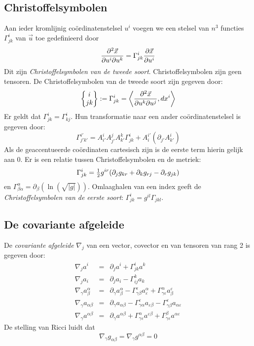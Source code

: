 \subsection{Christoffelsymbolen}
Aan ieder kromlijnig co\"ordinatenstelsel $u^i$ voegen we een stelsel van $n^3$
functies $\Gamma^i_{jk}$ van $\vec{u}$ toe gedefinieerd door
\[
\frac{\partial^2\vec{x}}{\partial u^i\partial u^k}=\Gamma_{jk}^i\frac{\partial \vec{x}}{\partial u^i}
\]
Dit zijn {\it Christoffelsymbolen van de tweede soort}. Christoffelsymbolen
zijn geen tensoren. De Christoffelsymbolen van de tweede soort zijn gegeven
door:
\[
\left\{\begin{array}{@{}c@{}}i\\ jk \end{array}\right\}:=\Gamma^i_{jk}=
\left\langle\frac{\partial^2\vec{x}}{\partial u^k\partial u^j},dx^i\right\rangle
\]
Er geldt dat $\Gamma^i_{jk}=\Gamma^i_{kj}$. Hun transformatie naar een ander
co\"ordinatenstelsel is gegeven door:
\[
\Gamma_{j'k'}^{i'}=A_{i'}^iA_{j'}^jA_{k'}^k\Gamma^i_{jk}+A_i^{i'}(\partial_{j'}A_{k'}^i)
\]
Als de geaccentueerde co\"ordinaten cartesisch zijn is de eerste term hierin
gelijk aan 0.
\npar
Er is een relatie tussen Christoffelsymbolen en de metriek:
\[
\Gamma_{jk}^i=\mbox{$\frac{1}{2}$} g^{ir}(\partial_j g_{kr}+\partial_k g_{rj}-\partial_r g_{jk})
\]
en $\Gamma^\alpha_{\beta\alpha}=\partial_\beta(\ln(\sqrt{|g|}))$.
\npar
Omlaaghalen van een index geeft de {\it Christoffelsymbolen van de eerste soort}:
$\Gamma^i_{jk}=g^{il}\Gamma_{jkl}$.

\subsection{De covariante afgeleide}
De {\it covariante afgeleide} $\nabla_j$ van een vector, covector en van
tensoren van rang 2 is gegeven door:
\begin{eqnarray*}
\nabla_ja^i                  &=&\partial_ja^i+\Gamma^i_{jk}a^k\\
\nabla_ja_i                  &=&\partial_ja_i-\Gamma^k_{ij}a_k\\
\nabla_\gamma a^\alpha_\beta &=&\partial_\gamma a^\alpha_\beta -\Gamma^\varepsilon_{\gamma\beta} a^\alpha_\varepsilon+\Gamma^\alpha_{\gamma\varepsilon}a_\beta^\varepsilon\\
\nabla_\gamma a_{\alpha\beta}&=&\partial_\gamma a_{\alpha\beta}-\Gamma^\varepsilon_{\gamma\alpha}a_{\varepsilon\beta}-\Gamma^\varepsilon_{\gamma\beta}a_{\alpha\varepsilon}\\
\nabla_\gamma a^{\alpha\beta}&=&\partial_\gamma a^{\alpha\beta}+\Gamma^\alpha_{\gamma\varepsilon}a^{\varepsilon\beta}+\Gamma^\beta_{\gamma\varepsilon}a^{\alpha\varepsilon}
\end{eqnarray*}
De stelling van Ricci luidt dat
\[
\nabla_\gamma g_{\alpha\beta}=\nabla_\gamma g^{\alpha\beta}=0
\]

